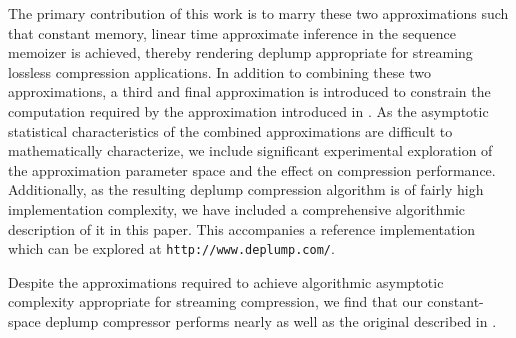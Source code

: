 The primary contribution of this work is to marry these two approximations such that constant memory, linear time approximate inference in the sequence memoizer is achieved, thereby rendering deplump appropriate for streaming lossless compression applications.  In addition to combining these two approximations, a third and final approximation is introduced to constrain the computation required by the approximation introduced in  \citep{Gasthaus2011}. As the asymptotic statistical characteristics of the combined approximations are difficult to mathematically characterize, we include significant experimental exploration of the approximation parameter space and the effect on compression performance.  Additionally, as the resulting deplump compression algorithm is of fairly high implementation complexity, we have included a comprehensive algorithmic description of it in this paper.  This accompanies a reference implementation which can be explored at \texttt{http://www.deplump.com/}.

Despite the approximations required to achieve algorithmic asymptotic complexity appropriate for streaming compression, we find that our constant-space deplump compressor performs nearly as well as the original described in \citep{Gasthaus2010}.  %